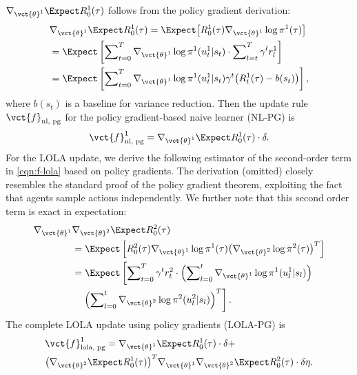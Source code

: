 $\nabla_{\vct{\theta}^1}  \Expect R^1_0(\tau)$ follows from the policy gradient derivation:
\begin{align*}
&\nabla_{\vct{\theta}^1}  \Expect R^1_0(\tau) = \Expect\big[R^1_0(\tau) \nabla_{\vct{\theta}^1}\log \pi^1(\tau)\big]  \\
 &= \Expect\left[\sum\nolimits_{t=0}^{T} \nabla_{\vct{\theta}^1}  \log \pi^1(u^1_t|s_t) \cdot \sum\nolimits_{l=t}^{T} \gamma^l r^1_{l} \right] \\
 &= \Expect\left[\sum\nolimits_{t=0}^{T} \nabla_{\vct{\theta}^1}  \log \pi^1(u^1_t|s_t)  \gamma^t \big(R^1_t(\tau) - b(s_t)\big)\right],
\end{align*}
where $b(s_t)$ is a baseline for variance reduction. Then the update rule $\vct{f}_{\text{nl, pg}}$ for the policy gradient-based naive learner (NL-PG) is
\begin{equation} \label{eqn:f-nl-pg}
\vct{f}^1_{\text{nl, pg}} = \nabla_{\vct{\theta}^1}  \Expect R^1_0(\tau) \cdot \delta.
\end{equation}
For the LOLA update, we derive the following estimator of the second-order term in \eqref{eqn:f-lola} based on policy gradients. The derivation (omitted) closely resembles the standard proof of the policy gradient theorem, exploiting the fact that agents sample actions independently. We further note that this second order term is exact in expectation:
\begin{align}
\nabla_{\vct{\theta}^1}& \nabla_{\vct{\theta}^2} \Expect R^2_0(\tau)  \nonumber \\ &= \Expect\left[R^2_0(\tau)\nabla_{\vct{\theta}^1}\log \pi^1(\tau) \big(\nabla_{\vct{\theta}^2}\log \pi^2(\tau)\big)^T \right] \nonumber  \\
 & = \Expect \left[\sum\nolimits_{t=0}^{T} \gamma^t r^2_t\cdot  \left(\sum\nolimits_{l=0}^t \nabla_{\vct{\theta}^1} \log \pi^1(u^1_l|s_l) \right)\right. \nonumber  \\
& \quad \left. \left( \sum\nolimits_{l=0}^t \nabla_{\vct{\theta}^2} \log \pi^2(u^2_l|s_l) \right)^T \right]. \label{eqn:second-order}
\end{align} 
The complete LOLA update using policy gradients (LOLA-PG) is
\begin{align}
& \vct{f}^1_{\text{lola, pg}}= \nabla_{\vct{\theta}^1}  \Expect R^1_0(\tau) \cdot \delta + \nonumber \\
& \big(\nabla_{\vct{\theta}^2} \Expect R^1_0(\tau) \big)^T \nabla_{\vct{\theta}^1} \nabla_{\vct{\theta}^2} \Expect R^2_0 (\tau) \cdot \delta \eta.  \label{eqn:f-lola-pg}
\end{align}


